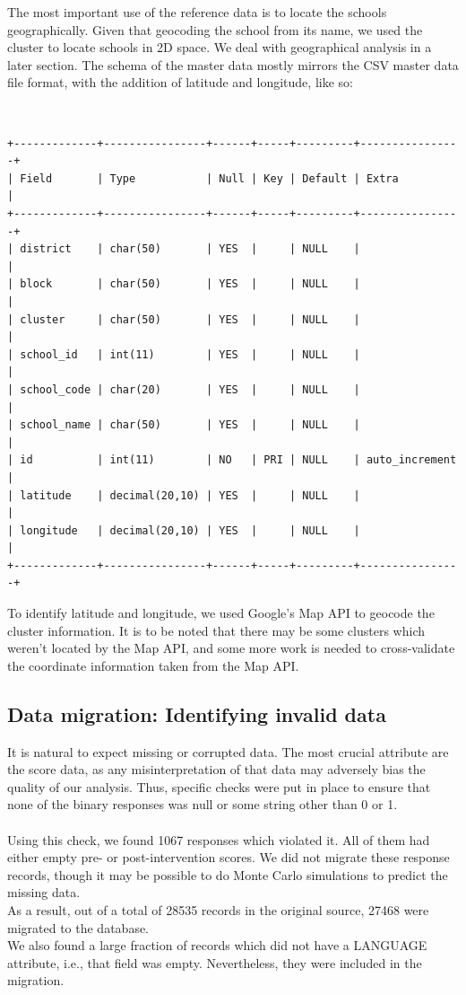 \documentclass[10pt]{article}
\begin{document}
The most important use of the reference data is to locate the schools geographically. Given that geocoding the school from its name, we used the cluster to locate schools in 2D space. We deal with geographical analysis in a later section. The schema of the master data mostly mirrors the CSV master data file format, with the addition of latitude and longitude, like so:

{\tt
\begin{verbatim}
+-------------+----------------+------+-----+---------+----------------+
| Field       | Type           | Null | Key | Default | Extra          |
+-------------+----------------+------+-----+---------+----------------+
| district    | char(50)       | YES  |     | NULL    |                |
| block       | char(50)       | YES  |     | NULL    |                |
| cluster     | char(50)       | YES  |     | NULL    |                |
| school_id   | int(11)        | YES  |     | NULL    |                |
| school_code | char(20)       | YES  |     | NULL    |                |
| school_name | char(50)       | YES  |     | NULL    |                |
| id          | int(11)        | NO   | PRI | NULL    | auto_increment |
| latitude    | decimal(20,10) | YES  |     | NULL    |                |
| longitude   | decimal(20,10) | YES  |     | NULL    |                |
+-------------+----------------+------+-----+---------+----------------+
\end{verbatim}
}

To identify latitude and longitude, we used Google's Map API to geocode the cluster information. It is to be noted that there may be some clusters which weren't located by the Map API, and some more work is needed to cross-validate the coordinate information taken from the Map API.

\subsection{Data migration: Identifying invalid data}
It is natural to expect missing or corrupted data. The most crucial attribute are the score data, as any misinterpretation of that data may adversely bias the quality of our analysis. Thus, specific checks were put in place to ensure that none of the binary responses was null or some string other than 0 or 1.\\\\
Using this check, we found 1067 responses which violated it. All of them had either empty pre- or post-intervention scores. We did not migrate these response records, though it may be possible to do Monte Carlo simulations to predict the missing data.\\
As a result, out of a total of 28535 records in the original source, 27468 were migrated to the database.\\
We also found a large fraction of records which did not have a LANGUAGE attribute, i.e., that field was empty. Nevertheless, they were included in the migration.
\end{document}
